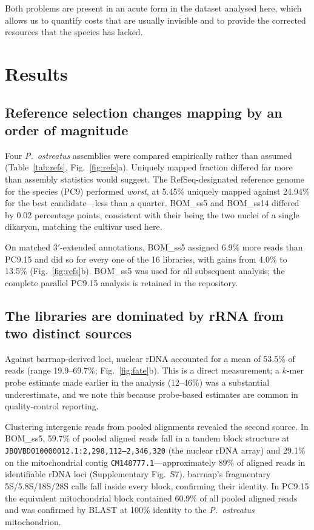 Both problems are present in an acute form in the dataset analysed here, which allows us to
quantify costs that are usually invisible and to provide the corrected resources that the
species has lacked.

\section{Results}

\subsection{Reference selection changes mapping by an order of magnitude}\label{sec:refs}

Four \textit{P.\ ostreatus} assemblies were compared empirically rather than assumed
(Table~\ref{tab:refs}, Fig.~\ref{fig:refs}a). Uniquely mapped fraction differed far more than
assembly statistics would suggest. The RefSeq-designated reference genome for the species
(PC9) performed \emph{worst}, at 5.45\% uniquely mapped against 24.94\% for the best
candidate---less than a quarter. BOM\_ss5 and BOM\_ss14 differed by 0.02 percentage points,
consistent with their being the two nuclei of a single dikaryon, matching the cultivar used
here.

On matched 3$'$-extended annotations, BOM\_ss5 assigned 6.9\% more reads than PC9.15 and did
so for every one of the 16 libraries, with gains from 4.0\% to 13.5\%
(Fig.~\ref{fig:refs}b). BOM\_ss5 was used for all subsequent analysis; the complete parallel
PC9.15 analysis is retained in the repository.

\subsection{The libraries are dominated by rRNA from two distinct sources}\label{sec:rrna}

Against barrnap-derived loci, nuclear rDNA accounted for a mean of 53.5\% of reads
(range 19.9--69.7\%; Fig.~\ref{fig:fate}b). This is a direct measurement; a $k$-mer probe
estimate made earlier in the analysis (12--46\%) was a substantial underestimate, and we note
this because probe-based estimates are common in quality-control reporting.

Clustering intergenic reads from pooled alignments revealed the second source. In BOM\_ss5,
59.7\% of pooled aligned reads fall in a tandem block structure at
\texttt{JBQVBD010000012.1:2{,}298{,}112--2{,}346{,}320} (the nuclear rDNA array) and 29.1\% on
the mitochondrial contig \texttt{CM148777.1}---approximately 89\% of aligned reads in
identifiable rDNA loci (Supplementary Fig.~S7). barrnap's fragmentary 5S/5.8S/18S/28S calls
fall inside every block, confirming their identity. In PC9.15 the equivalent mitochondrial
block contained 60.9\% of all pooled aligned reads and was confirmed by BLAST at 100\%
identity to the \textit{P.\ ostreatus} mitochondrion.

